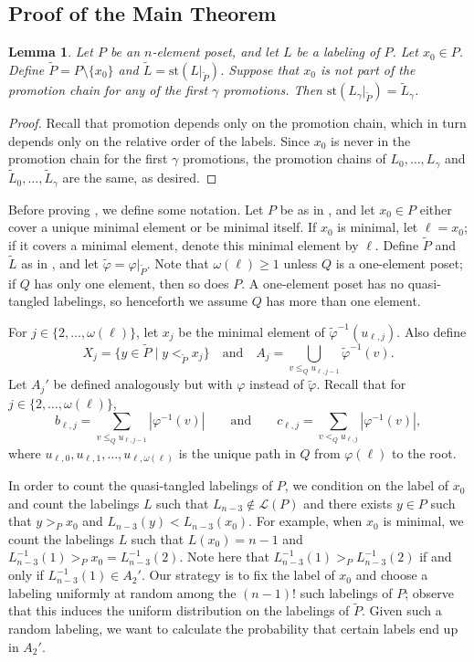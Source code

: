 \documentclass[11pt]{amsart}
\newtheorem{lemma}[thm]{Lemma}
\theoremstyle{definition}
\newcommand{\call}{\mathcal{L}}
\newcommand{\inverse}{^{-1}}
\newcommand{\st}{\mathrm{st}}
\newcommand{\vphi}{\varphi}
\begin{document}
\subsection{Proof of the Main Theorem}
\begin{lemma}\label{standardization}
	Let $ P $ be an $ n $-element poset, and let $ L $ be a labeling of $ P $. Let $ x_0\in P $. Define $ \tilde{P}=P\setminus\{x_0\} $ and $ \tilde{L}=\st(L|_{\tilde{P}}) $. Suppose that $ x_0 $ is not part of the promotion chain for any of the first $ \gamma $ promotions. Then $ \st(L_\gamma|_{\tilde{P}})=\tilde{L}_{\gamma} $.
\end{lemma}
\begin{proof}
	Recall that promotion depends only on the promotion chain, which in turn depends only on the relative order of the labels. Since $ x_0 $ is never in the promotion chain for the first $ \gamma $ promotions, the promotion chains of $ L_0,\ldots,L_{\gamma} $ and $ \tilde{L}_0,\ldots,\tilde{L}_{\gamma} $ are the same, as desired.
\end{proof}
Before proving , we define some notation. Let $ P $ be as in , and let $ x_0\in P $ either cover a unique minimal element or be minimal itself. If $ x_0 $ is minimal, let $ \ell=x_0 $; if it covers a minimal element, denote this minimal element by $ \ell $. Define $ \tilde{P} $ and $ \tilde{L} $ as in , and let $ \tilde{\vphi}=\vphi|_{\tilde{P}} $. Note that $ \omega(\ell)\geq1 $ unless $ Q $ is a one-element poset; if $ Q $ has only one element, then so does $ P $. A one-element poset has no quasi-tangled labelings, so henceforth we assume $ Q $ has more than one element. 

For $ j\in\{2,\ldots,\omega(\ell)\} $, let $ x_j $ be the minimal element of $ \tilde{\vphi}\inverse(u_{\ell,j}) $. Also define \[X_j=\{y\in\tilde{P}\;|\;y<_{\tilde{P}}x_j\}\quad\mathrm{and}\quad A_j=\bigcup_{v\leq_Qu_{\ell,j-1}}\tilde{\varphi}\inverse(v).\] Let $ A_j' $ be defined analogously but with $ \vphi $ instead of $ \tilde{\vphi} $. Recall that for $ j\in\{2,\ldots,\omega(\ell)\} $, \[b_{\ell,j}=\sum_{v\leq_Q u_{\ell,j-1}}|\varphi\inverse(v)|\qquad\mathrm{and}\qquad c_{\ell,j}=\sum_{v<_Q u_{\ell,j}}|\varphi\inverse(v)|,\] where $ u_{\ell,0},u_{\ell,1},\ldots,u_{\ell,\omega(\ell)} $ is the unique path in $ Q $ from $ \vphi(\ell) $ to the root. 

In order to count the quasi-tangled labelings of $ P $, we condition on the label of $ x_0 $ and count the labelings $ L $ such that $ L_{n-3}\not\in\call(P) $ and there exists $ y\in P $ such that $ y>_P x_0 $ and $ L_{n-3}(y)<L_{n-3}(x_0) $. For example, when $ x_0 $ is minimal, we count the labelings $ L $ such that $ L(x_0)=n-1 $ and $ L_{n-3}\inverse(1)>_Px_0=L_{n-3}\inverse(2) $. Note here that $ L_{n-3}\inverse(1)>_PL_{n-3}\inverse(2) $ if and only if $ L_{n-3}\inverse(1)\in A_2' $. Our strategy is to fix the label of $ x_0 $ and choose a labeling uniformly at random among the $ (n-1)! $ such labelings of $ P $; observe that this induces the uniform distribution on the labelings of $ \tilde{P} $. Given such a random labeling, we want to calculate the probability that certain labels end up in $ A_2' $.
\end{document}
